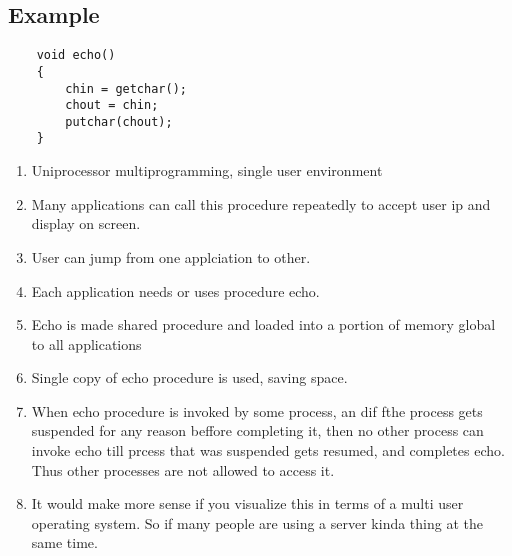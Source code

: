 \documentclass[11pt]{article}
\begin{document}
\subsection{Example}

\begin{verbatim}
    void echo()
    {
        chin = getchar();
        chout = chin;
        putchar(chout);
    }
\end{verbatim}

\begin{enumerate}
    \item Uniprocessor multiprogramming, single user environment
    \item Many applications can call this procedure repeatedly to accept user ip and display on screen. 
    \item User can jump from one applciation to other. 
    \item Each application needs or uses procedure echo. 
    \item Echo is made shared procedure and loaded into a portion of memory global to all applications 
    \item Single copy of echo procedure is used, saving space. 
    \item When echo procedure is invoked by some process, an dif fthe process gets suspended for any reason beffore completing it, then no other process can invoke echo till prcess that was suspended gets resumed, and completes echo. Thus other processes are not allowed to access it. 
    \item It would make more sense if you visualize this in terms of a multi user operating system. So if many people are using a server kinda thing at the same time. 
\end{enumerate}
\end{document}
